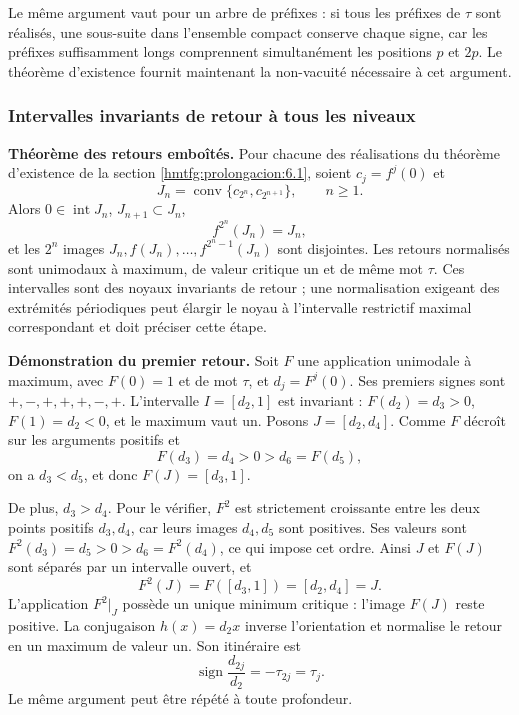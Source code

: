 Le même argument vaut pour un arbre de préfixes : si tous les préfixes de \(\tau\) sont réalisés, une sous-suite dans l’ensemble compact conserve chaque signe, car les préfixes suffisamment longs comprennent simultanément les positions \(p\) et \(2p\). Le théorème d’existence fournit maintenant la non-vacuité nécessaire à cet argument.

\subsubsection{Intervalles invariants de retour à tous les niveaux}
\label{hmtfg:prolongacion:6.3}

\textbf{Théorème des retours emboîtés.} Pour chacune des réalisations du théorème d’existence de la section \ref{hmtfg:prolongacion:6.1}, soient \(c_j=f^j(0)\) et
\[
J_n=\operatorname{conv}\{c_{2^n},c_{2^{n+1}}\},\qquad n\ge1.
\]
Alors \(0\in\operatorname{int}J_n\), \(J_{n+1}\subset J_n\),
\[
f^{2^n}(J_n)=J_n,
\]
et les \(2^n\) images \(J_n,f(J_n),\ldots,f^{2^n-1}(J_n)\) sont disjointes. Les retours normalisés sont unimodaux à maximum, de valeur critique un et de même mot \(\tau\). Ces intervalles sont des noyaux invariants de retour ; une normalisation exigeant des extrémités périodiques peut élargir le noyau à l’intervalle restrictif maximal correspondant et doit préciser cette étape.

\textbf{Démonstration du premier retour.} Soit \(F\) une application unimodale à maximum, avec \(F(0)=1\) et de mot \(\tau\), et \(d_j=F^j(0)\). Ses premiers signes sont \(+,-,+,+,+,-,+\). L’intervalle \(I=[d_2,1]\) est invariant : \(F(d_2)=d_3>0\), \(F(1)=d_2<0\), et le maximum vaut un. Posons \(J=[d_2,d_4]\). Comme \(F\) décroît sur les arguments positifs et
\[
F(d_3)=d_4>0> d_6=F(d_5),
\]
on a \(d_3<d_5\), et donc \(F(J)=[d_3,1]\).

De plus, \(d_3>d_4\). Pour le vérifier, \(F^2\) est strictement croissante entre les deux points positifs \(d_3,d_4\), car leurs images \(d_4,d_5\) sont positives. Ses valeurs sont \(F^2(d_3)=d_5>0>d_6=F^2(d_4)\), ce qui impose cet ordre. Ainsi \(J\) et \(F(J)\) sont séparés par un intervalle ouvert, et
\[
F^2(J)=F([d_3,1])=[d_2,d_4]=J.
\]
L’application \(F^2|_J\) possède un unique minimum critique : l’image \(F(J)\) reste positive. La conjugaison \(h(x)=d_2x\) inverse l’orientation et normalise le retour en un maximum de valeur un. Son itinéraire est
\[
\operatorname{sign}\frac{d_{2j}}{d_2}
=-\tau_{2j}=\tau_j.
\]
Le même argument peut être répété à toute profondeur.

